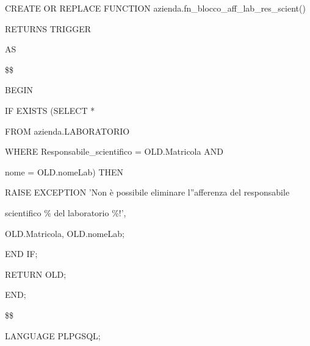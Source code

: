         \begin{flushleft}
            \begin{description}
                \item CREATE OR REPLACE FUNCTION azienda.fn\_blocco\_aff\_lab\_res\_scient()
                \item RETURNS TRIGGER
                \item AS
                \item \$\$
                \item BEGIN
                \begin{description}
                    \item IF EXISTS (SELECT *
                    \item \hspace{1.9cm} FROM azienda.LABORATORIO
                    \item \hspace{1.9cm} WHERE Responsabile\_scientifico = OLD.Matricola AND
                    \item \hspace{3cm}   nome = OLD.nomeLab) THEN
                    \vspace{0.2cm}
                    \begin{description} 
                        \item RAISE EXCEPTION 'Non è possibile eliminare l''afferenza del responsabile 
                        \item \hspace{2.8cm} scientifico \% del laboratorio \%!',
                        \item \hspace{2.8cm} OLD.Matricola, OLD.nomeLab;
                    \end{description}
                    \item END IF;
                \end{description}

                \vspace{0.5cm}

                \begin{description}
                    \item RETURN OLD;
                \end{description}

                \item END;
                \item \$\$
                \item LANGUAGE PLPGSQL;
            \end{description}
        \end{flushleft}
    \normalfont

